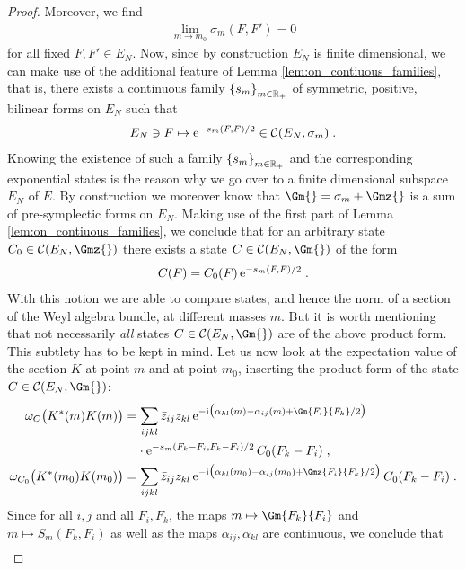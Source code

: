 \begin{proof}
		Moreover, we find
		\begin{align}
			\lim\limits_{m \to m_0} \sigma_m (F,F') = 0
		\end{align}
		for all fixed $F,F' \in E_N$. 
		Now, since by construction $E_N$ is finite dimensional, we can make use of the additional feature of Lemma \ref{lem:on_contiuous_families}, that is, there exists a continuous family $\left\{ s_m \right\}_{m \in \mathbb{R}_+}$ of symmetric, positive, bilinear forms on $E_N$ such that
			\begin{align}
				E_N \ni F \mapsto \mathrm{e}^{- s_m(F,F) /2} \in \mathcal{C} (E_N,\sigma_m) \;.
			\end{align}
	Knowing the existence of such a family $\left\{ s_m \right\}_{m \in \mathbb{R}_+}$ and the corresponding exponential states is the reason why we go over to a finite dimensional subspace $E_N$ of $E$.
	By construction we moreover know that $\Gm{} = \sigma_m + \Gmz{}$ is a sum of pre-symplectic forms on $E_N$. Making use of the first part of Lemma \ref{lem:on_contiuous_families}, we conclude that for an arbitrary state $C_0 \in \C (E_N , \Gmz{})$ there exists a state $C \in \C (E_N , \Gm{})$ of the form
	\begin{align}
		C (F) = C_0(F) \, \mathrm{e}^{- s_m(F,F) /2} \;.
	\end{align}
	With this notion we are able to compare states, and hence the norm of a section of the Weyl algebra bundle, at different masses $m$. But it is worth mentioning that not necessarily \emph{all} states $C \in \C (E_N , \Gm{})$ are of the above product form. This subtlety has to be kept in mind. 
	Let us now look at the expectation value of the section $K$ at point $m$ and at point $m_0$, inserting the product form of the state $C \in \C (E_N , \Gm{})$:
	\begin{align}
		\omega_C\big( K^*(m) K(m) \big)
		&= \sum_{ijkl} \bar{z}_{ij}z_{kl} \, \e^{-\i \big(  \alpha_{kl}(m)  - \alpha_{ij}(m) + \Gm{F_i}{F_k}/2\big)} \notag \\ &\phantom{M}\cdot \e^{-s_m(F_k - F_i , F_k - F_i) /2} \, C_0(F_k - F_i)  \formspace,\\
		\omega_{C_0}\big( K^*(m_0) K(m_0) \big)
		&= \sum_{ijkl} \bar{z}_{ij}z_{kl} \, \e^{-\i \big(  \alpha_{kl}(m_0)  - \alpha_{ij}(m_0) + \Gmz{F_i}{F_k}/2\big)} \, C_0(F_k - F_i) \formspace.
		\end{align}	
Since for all $i,j$ and all $F_i, F_k$, the maps $m \mapsto \Gm{F_k}{F_i}$ and $m \mapsto S_m(F_k,F_i)$ as well as the maps $\alpha_{ij}, \alpha_{kl}$ are continuous, we conclude that
\begin{align}

\end{align}
\end{proof}

